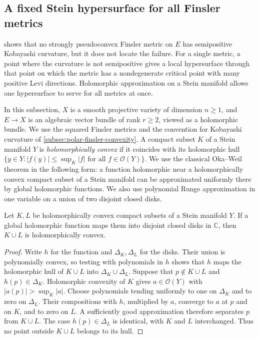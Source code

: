 \subsection{A fixed Stein hypersurface for all Finsler metrics}
\label{subsec:fixed-stein-finsler-hypersurface}

 shows that no strongly pseudoconvex Finsler metric on $E$ has semipositive Kobayashi curvature, but it does not locate the failure. For a single metric, a point where the curvature is not semipositive gives a local hypersurface through that point on which the metric has a nondegenerate critical point with many positive Levi directions. Holomorphic approximation on a Stein manifold allows one hypersurface to serve for all metrics at once.

In this subsection, $X$ is a smooth projective variety of dimension $n\geq1$, and $E\to X$ is an algebraic vector bundle of rank $r\geq2$, viewed as a holomorphic bundle. We use the squared Finsler metrics and the convention for Kobayashi curvature of \cref{subsec:polar-finsler-convexity}. A compact subset $K$ of a Stein manifold $Y$ is \emph{holomorphically convex} if it coincides with its holomorphic hull $\{y\in Y:|f(y)|\leq\sup_K|f|\text{ for all }f\in\mathcal O(Y)\}$. We use the classical Oka--Weil theorem in the following form: a function holomorphic near a holomorphically convex compact subset of a Stein manifold can be approximated uniformly there by global holomorphic functions. We also use polynomial Runge approximation in one variable on a union of two disjoint closed disks.

\begin{lemma}\label{lem:separated-holomorphic-convex-compacts}
Let $K,L$ be holomorphically convex compact subsets of a Stein manifold $Y$. If a global holomorphic function maps them into disjoint closed disks in $\mathbb C$, then $K\cup L$ is holomorphically convex.
\end{lemma}
\begin{proof}
Write $h$ for the function and $\Delta_K,\Delta_L$ for the disks. Their union is polynomially convex, so testing with polynomials in $h$ shows that $h$ maps the holomorphic hull of $K\cup L$ into $\Delta_K\cup\Delta_L$. Suppose that $p\notin K\cup L$ and $h(p)\in\Delta_K$. Holomorphic convexity of $K$ gives $a\in\mathcal O(Y)$ with $|a(p)|>\sup_K|a|$. Choose polynomials tending uniformly to one on $\Delta_K$ and to zero on $\Delta_L$. Their compositions with $h$, multiplied by $a$, converge to $a$ at $p$ and on $K$, and to zero on $L$. A sufficiently good approximation therefore separates $p$ from $K\cup L$. The case $h(p)\in\Delta_L$ is identical, with $K$ and $L$ interchanged. Thus no point outside $K\cup L$ belongs to its hull.
\end{proof}

